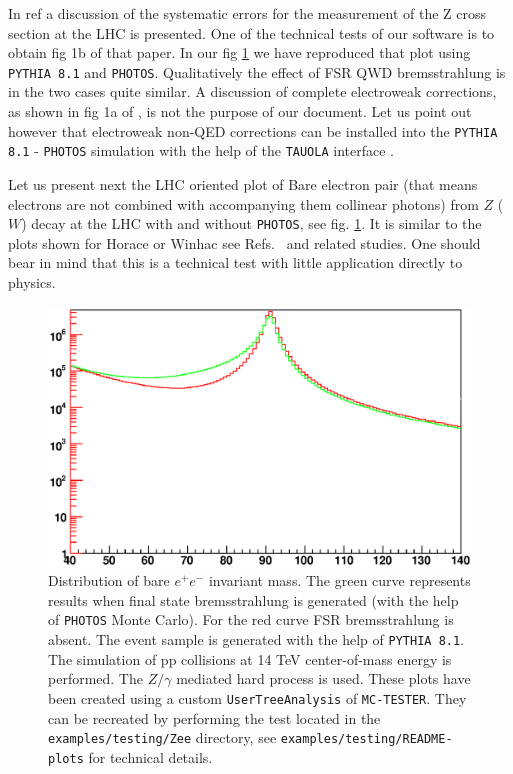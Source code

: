 \documentclass[]{Photos_interface_design}
\begin{document}
In ref \cite{Adam:2008ge} a discussion of the systematic errors for the measurement of the Z cross 
section at the LHC is presented. One of the technical tests of our software is to obtain
fig 1b of that paper. In our fig \ref{fig:lineshape} we have 
reproduced that plot using {\tt PYTHIA 8.1} and {\tt PHOTOS}. Qualitatively the effect
of FSR QWD bremsstrahlung is in the two cases quite similar. A discussion
of complete electroweak corrections, as shown in fig 1a of  \cite{Adam:2008ge},
is not the purpose of our document. Let us point out however that electroweak 
non-QED corrections can be installed into the {\tt PYTHIA 8.1} - {\tt PHOTOS} simulation with 
the help of the {\tt TAUOLA} interface \cite{Davidson:2010rw}.

Let us present next the LHC oriented plot of Bare electron pair (that means electrons are not combined with accompanying them collinear photons) from $Z$
($W$) decay at the LHC with and without {\tt PHOTOS}, see fig. \ref{fig:lineshape}. It is similar to
the plots shown for Horace or Winhac see Refs.~\cite{CarloniCalame:2003ux,Winhac} and related
studies.
One should bear in mind that this is a technical test with little application directly to physics.
\begin{figure}[h!]
\centering
\includegraphics[scale=0.85]{lineshape.eps}
\caption{Distribution of bare $e^+e^-$ invariant mass. The green curve represents results when final state 
bremsstrahlung is generated (with the help of {\tt PHOTOS} Monte Carlo). For the red curve FSR 
bremsstrahlung is absent. The event sample is generated with the help of {\tt PYTHIA 8.1}.
The simulation of pp collisions at 14 TeV center-of-mass energy is performed.
The $Z/\gamma$ mediated hard process is used.
These plots have been created using a custom {\tt UserTreeAnalysis} of {\tt MC-TESTER}.
They can be recreated by performing the test located in the {\tt examples/testing/Zee} directory, see  {\tt examples/testing/README-plots} for technical details.
\label{fig:lineshape}
}
\end{figure}
\end{document}
